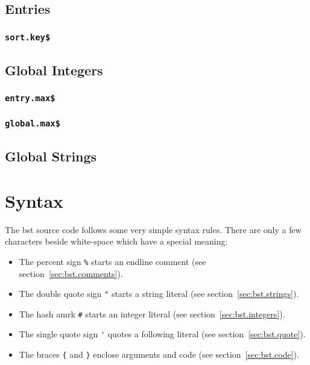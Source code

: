 \subsection{Entries}

\INCOMPLETE

\subsubsection{\texttt{sort.key\$}}%

\INCOMPLETE


\subsection{Global Integers}

\INCOMPLETE

\subsubsection{\texttt{entry.max\$}}%

\INCOMPLETE
\subsubsection{\texttt{global.max\$}}%

\INCOMPLETE

\subsection{Global Strings}

\INCOMPLETE


\section{Syntax}

The bst source code follows some very simple syntax rules. There are
only a few characters beside white-space which have a special meaning:

\begin{itemize}
\item The percent sign \verb|%| starts an endline comment (see
  section~\ref{sec:bst.comments}).
\item The double quote sign \verb|"| starts a string literal (see
  section~\ref{sec:bst.strings}).
\item The hash amrk \verb|#| starts an integer literal (see
  section~\ref{sec:bst.integers}).
\item The single quote sign \verb|'| quotes a following literal (see
  section~\ref{sec:bst.quote}).
\item The braces \verb|{| and \verb|}| enclose arguments and code (see
  section~\ref{sec:bst.code}).
\end{itemize}



